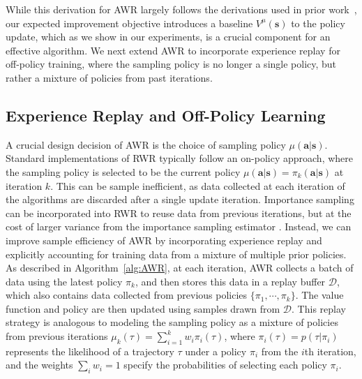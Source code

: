 While this derivation for AWR largely follows the derivations used in prior work~\citep{Peters2010REP,abdolmaleki2018maximum}, our expected improvement objective introduces a baseline $V^\mu({\mathbf{s}})$ to the policy update, which as we show in our experiments, is a crucial component for an effective algorithm. We next extend AWR to incorporate experience replay for off-policy training, where the sampling policy is no longer a single policy, but rather a mixture of policies from past iterations.

\subsection{Experience Replay and Off-Policy Learning}
\label{sec:ReplayDerivation}

A crucial design decision of AWR is the choice of sampling policy $\mu({\mathbf{a}} | {\mathbf{s}})$. Standard implementations of RWR typically follow an on-policy approach, where the sampling policy is selected to be the current policy $\mu({\mathbf{a}} | {\mathbf{s}}) = \pi_k({\mathbf{a}} | {\mathbf{s}})$ at iteration $k$. This can be sample inefficient, as data collected at each iteration of the algorithms are discarded after a single update iteration. Importance sampling can be incorporated into RWR to reuse data from previous iterations, but at the cost of larger variance from the importance sampling estimator \citep{POWER2008}. Instead, we can improve sample efficiency of AWR by incorporating experience replay and explicitly accounting for training data from a mixture of multiple prior policies. As described in Algorithm~\ref{alg:AWR}, at each iteration, AWR collects a batch of data using the latest policy $\pi_k$, and then stores this data in a replay buffer $\mathcal{D}$, which also contains data collected from previous policies $\{\pi_1, \cdots, \pi_k\}$. The value function and policy are then updated using samples drawn from $\mathcal{D}$. This replay strategy is analogous to modeling the sampling policy as a mixture of policies from previous iterations ${\mu_k(\tau) = \sum_{i = 1}^k w_i \pi_i(\tau)}$, where $\pi_i(\tau) = p(\tau | \pi_i)$ represents the likelihood of a trajectory $\tau$ under a policy $\pi_i$ from the $i$th iteration, and the weights $\sum_i w_i = 1$ specify the probabilities of selecting each policy $\pi_i$.

